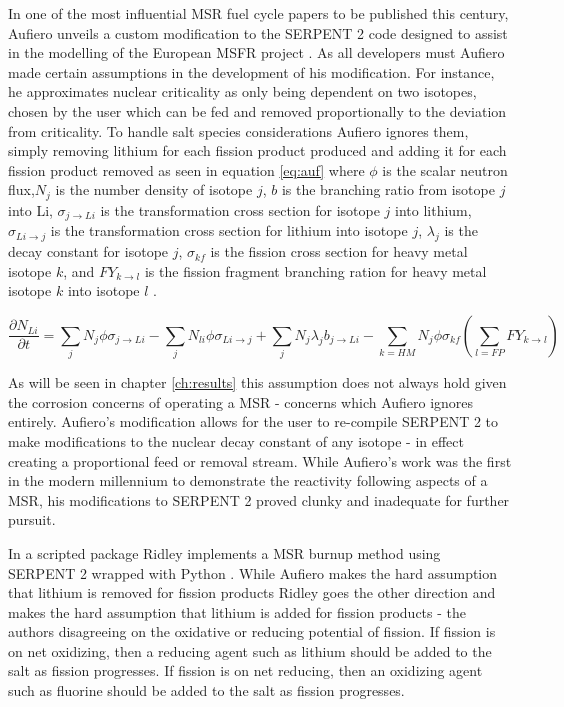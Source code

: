In one of the most influential MSR fuel cycle papers to be published this
century, Aufiero unveils a custom modification to the SERPENT 2 code designed to
assist in the modelling of the European MSFR project \cite{Aufiero}. As all
developers must Aufiero made certain assumptions in the development of his
modification. For instance, he
 approximates nuclear criticality as only being dependent 
on two isotopes, chosen by the user which can be fed and removed proportionally
to the deviation from criticality. To handle salt species considerations Aufiero
ignores them, simply removing lithium for each fission product produced and
adding it for each fission product removed as seen in equation \ref{eq:auf} 
where $\phi$ is the scalar neutron flux,$N_{j}$ is the number density of
isotope $j$, $b$ is the branching ratio
from isotope $j$ into Li, $\sigma_{j \rightarrow Li}$ is the transformation
cross section for isotope $j$ into lithium, $\sigma_{Li \rightarrow j}$ is the
transformation cross section for lithium into isotope $j$, $\lambda_{j}$ is
the decay constant for isotope $j$, $\sigma_{kf}$ is the fission cross section
for heavy metal isotope $k$, and $FY_{k \rightarrow l}$ is the fission
fragment branching ration for heavy metal isotope $k$ into isotope $l$ \cite{Aufiero}. 

\begin{equation} \label{eq:auf}
\frac{\partial N_{Li}}{\partial t} = \sum_{j} N_{j} \phi \sigma_{j \rightarrow
    Li} - \sum_{j} N_{li} \phi \sigma_{Li \rightarrow j} + \sum_{j} N_{j}
    \lambda_{j} b_{j \rightarrow Li} - \sum_{k = HM} N_{j} \phi \sigma_{kf}
    \left ( \sum_{l=FP}FY_{k \rightarrow l} \right )
\end{equation}

As will be seen in chapter \ref{ch:results} this assumption does not always hold
given the corrosion concerns of operating a MSR - concerns which Aufiero ignores
entirely. Aufiero's modification allows for the user to re-compile SERPENT 2 to
make modifications to the nuclear decay constant of any isotope - in effect 
creating a proportional feed or removal stream. While Aufiero's work was the
first in the modern millennium to demonstrate the reactivity following aspects
of a MSR, his modifications to SERPENT 2 proved clunky and inadequate for
further pursuit.

In a scripted package Ridley implements a MSR burnup method using SERPENT 2
wrapped with Python \cite{Ridley}. 
While Aufiero makes the hard assumption that lithium is
removed for fission products Ridley goes the other direction and makes the
hard assumption that lithium is added for fission products - the authors
disagreeing on the oxidative or reducing potential of fission. If fission is on
net oxidizing, then a reducing agent such as lithium should be added to the salt
as fission progresses. If fission is on net reducing, then an oxidizing agent
such as fluorine should be added to the salt as fission progresses. 

